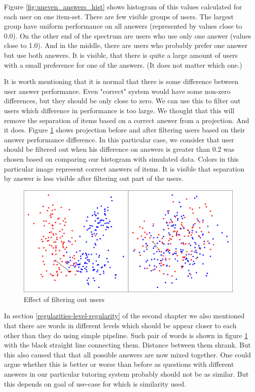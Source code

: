 \documentclass[
  digital, %
  table,   %
  nolof,     %
  nolot,     %
  nocover,
  color
]{fithesis3}
\begin{document}
Figure \ref{fig:uneven_answers_hist} shows histogram of this values calculated for each user on one item-set. There are few visible groups of users. The largest group have uniform performance on all answers (represented by values close to 0.0). On the other end of the spectrum are users who use only one answer (values close to 1.0). And in the middle, there are users who probably prefer one answer but use both answers. It is visible, that there is quite a large amount of users with a small preference for one of the answers. (It does not matter which one.)


It is worth mentioning that it is normal that there is some difference between user answer performance. Even "correct" system would have some non-zero differences, but they should be only close to zero. We can use this to filter out users which difference in performance is too large. We thought that this will remove the separation of items based on a correct answer from a projection. And it does. Figure \ref{fig:answers_normalization} shows projection before and after filtering users based on their answer performance difference. In this particular case, we consider that user should be filtered out when his difference on answers is greater than 0.2 was chosen based on comparing our histogram with simulated data. Colors in this particular image represent correct answers of items. It is visible that separation by answer is less visible after filtering out part of the users.

\begin{figure}
  \includegraphics[width=\textwidth]{img/answers_normalization}
  \caption{Effect of filtering out users}
  \label{fig:answers_normalization}
\end{figure}

In section \ref{regularities-level-regularity} of the second chapter we also mentioned that there are words in different levels which should be appear closer to each other than they do using simple pipeline. Such pair of words is shown in figure \ref{fig:answers_normalization} with the black straight line connecting them. Distance between them shrank. But this also caused that that all possible answers are now mixed together. One could argue whether this is better or worse than before as questions with different answers in our particular tutoring system probably should not be as similar. But this depends on goal of use-case for which is similarity used.
\end{document}
